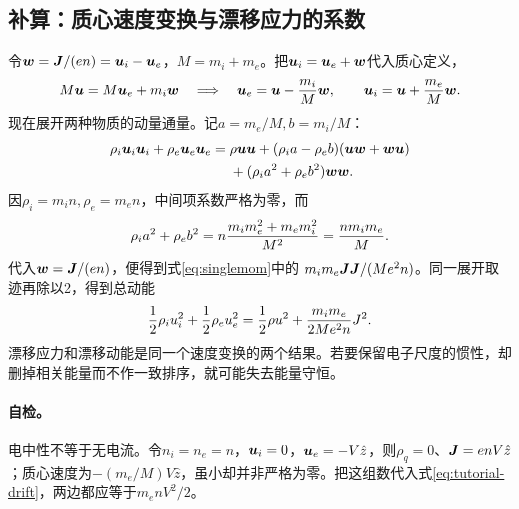 \subsection{补算：质心速度变换与漂移应力的系数}
令$\bm{w}=\bm{J}/(en)=\bm{u}_i-\bm{u}_e$，$M=m_i+m_e$。把$\bm{u}_i=\bm{u}_e+\bm{w}$代入质心定义，
\begin{equation}
 M\bm{u}=M\bm{u}_e+m_i\bm{w}
 \quad\Longrightarrow\quad
 \bm{u}_e=\bm{u}-{m_i\over M}\bm{w},\qquad
 \bm{u}_i=\bm{u}+{m_e\over M}\bm{w}.
\end{equation}
现在展开两种物质的动量通量。记$a=m_e/M,b=m_i/M$：
\begin{align}
 \rho_i\bm{u}_i\bm{u}_i+\rho_e\bm{u}_e\bm{u}_e
 ={}&\rho\bm{u}\bm{u}+
 (\rho_i a-\rho_e b)(\bm{u}\bm{w}+\bm{w}\bm{u})\\
 &+(\rho_i a^2+\rho_e b^2)\bm{w}\bm{w}.\nonumber
\end{align}
因$\rho_i=m_in,\rho_e=m_en$，中间项系数严格为零，而
\begin{equation}
 \rho_i a^2+\rho_e b^2
 =n{m_im_e^2+m_em_i^2\over M^2}
 ={nm_im_e\over M}.
\end{equation}
代入$\bm{w}=\bm{J}/(en)$，便得到式\eqref{eq:singlemom}中的
$m_im_e\bm{J}\bm{J}/(Me^2n)$。同一展开取迹再除以2，得到总动能
\begin{equation}
 {1\over2}\rho_iu_i^2+{1\over2}\rho_eu_e^2
 ={1\over2}\rho u^2+{m_im_e\over2Me^2n}J^2.
 \label{eq:tutorial-drift}
\end{equation}
漂移应力和漂移动能是同一个速度变换的两个结果。若要保留电子尺度的惯性，却删掉相关能量而不作一致排序，就可能失去能量守恒。

\paragraph{自检。}
电中性不等于无电流。令$n_i=n_e=n$，$\bm{u}_i=0$，$\bm{u}_e=-V\hat z$，则$\rho_q=0$、$\bm{J}=enV\hat z$；质心速度为$-(m_e/M)V\hat z$，虽小却并非严格为零。把这组数代入式\eqref{eq:tutorial-drift}，两边都应等于$m_enV^2/2$。
